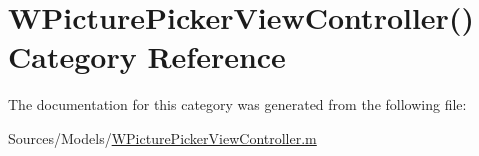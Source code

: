 \hypertarget{category_w_picture_picker_view_controller_07_08}{\section{W\-Picture\-Picker\-View\-Controller() Category Reference}
\label{category_w_picture_picker_view_controller_07_08}
}


The documentation for this category was generated from the following file\-:\begin{DoxyCompactItemize}
\item 
Sources/\-Models/\hyperlink{_w_picture_picker_view_controller_8m}{W\-Picture\-Picker\-View\-Controller.\-m}\end{DoxyCompactItemize}
